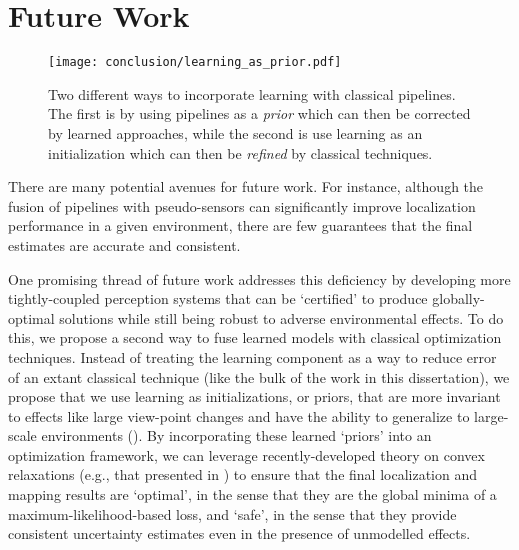 

\section{Future Work}

\begin{figure}
\begin{center}
		\texttt{[image: conclusion/learning\_as\_prior.pdf]}
		\caption{Two different ways to incorporate learning with classical pipelines. The first is by using pipelines as a \textit{prior} which can then be corrected by learned approaches, while the second is use learning as an initialization which can then be \textit{refined} by classical techniques.}
  	\label{fig:conc_learning_as_prior}
\end{center}
\end{figure}


There are many potential avenues for future work. For instance, although the fusion of pipelines with pseudo-sensors can significantly improve localization performance in a given environment, there are few guarantees that the final estimates are accurate and consistent.

One promising thread of future work addresses this deficiency by developing more tightly-coupled perception systems that can be ‘certified’ to produce globally-optimal solutions while still being robust to adverse environmental effects. To do this, we propose a second way to fuse learned models with classical optimization techniques. Instead of treating the learning component as a way to reduce error of an extant classical technique (like the bulk of the work in this dissertation), we propose that we use learning as initializations, or priors, that are more invariant to effects like large view-point changes and have the ability to generalize to large-scale environments (). By incorporating these learned ‘priors’ into an optimization framework, we can leverage recently-developed theory on convex relaxations (e.g., that presented in \cite{Rosen2019-kk}) to ensure that the final localization and mapping results are ‘optimal’, in the sense that they are the global minima of a maximum-likelihood-based loss, and ‘safe’, in the sense that they provide consistent uncertainty estimates even in the presence of unmodelled effects. 

